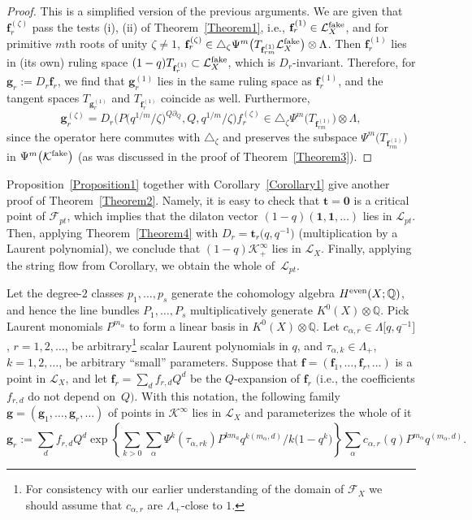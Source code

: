 \documentclass[pdftex]{sigma}
\def\F{\mathcal F}
\def\K{\mathcal K}
\def\L{\mathcal L}
\def\1{\mathbf 1}
\def\QQ{\mathbb Q}
\def\p{\partial}
\def\a{\alpha}
\def\f{{\mathbf f}}
\def\g{{\mathbf g}}
\def\t{{\mathbf t}}
\renewcommand{\Delta}{\triangle}
\begin{document}
\begin{proof} This is a simplified version of the previous arguments. We are given that $\f_r^{(\zeta)}$ pass the tests (i), (ii) of Theorem~\ref{Theorem1}, i.e.,
$\f_r^{(1)} \in \L_X^{\rm fake}$, and for primitive $m$th roots of unity $\zeta\neq 1$,
$\f_r^{(\zeta)}\in \Delta_{\zeta} \Psi^m\big(T_{\f_{rm}^{(1)}}\L_X^{\rm fake}\big)\otimes \Lambda$.
Then $\f_r^{(1)}$ lies in (its own) ruling space $(1-q)T_{\f_r^{(1)}}\subset \L_X^{\rm fake}$, which is $D_r$-invariant. Therefore, for $\g_r:=D_r\f_r$, we find that $\g_r^{(1)}$ lies in the same ruling space as $\f_r^{(1)}$, and the tangent spaces $T_{\g_r^{(1)}}$ and $T_{\f_r^{(1)}}$ coincide as well. Furthermore,
\[ \g_r^{(\zeta)} = D_r\big(P\big(q^{1/m}/\zeta\big)^{Q\p_Q}, Q, q^{1/m}/\zeta\big) f_r^{(\zeta)} \in
\Delta_{\zeta} \Psi^m\big(T_{\f_{rm}^{(1)}}\big)\otimes \Lambda ,\]
since the operator here commutes with $\Delta_{\zeta}$ and preserves the subspace $\Psi^m\big(T_{\f_{rm}^{(1)}}\big)$ in $\Psi^m\big(\K^{\rm fake}\big)$ (as was discussed in the proof of Theorem~\ref{Theorem3}). \end{proof}

\begin{remark} Proposition~\ref{Proposition1} together with Corollary~\ref{Corollary1} give another proof of Theorem~\ref{Theorem2}. Namely, it is easy to check that $\t={\mathbf 0}$ is a critical point of $\F_{pt}$, which implies that the dilaton vector $(1-q)(\1,\1,\dots)$ lies in $\L_{pt}$. Then, applying Theorem~\ref{Theorem4} with $D_r=\t_r\big(q,q^{-1}\big)$ (multiplication by a Laurent polynomial),
we conclude that $(1-q)\K^{\infty}_{+}$ lies in $\L_X$. Finally, applying the string flow from Corollary, we obtain the whole of~$\L_{pt}$. \end{remark}

\begin{theorem}\label{Theorem4} Let the degree-$2$ classes $p_1,\dots, p_s$ generate the cohomology algebra $H^{\rm even}(X;\QQ)$, and hence the line bundles $P_1,\dots,P_s$ multiplicatively generate $K^0(X)\otimes \QQ$. Pick Laurent monomials $P^{m_{\a}}$ to form a linear basis in $K^0(X)\otimes \QQ$. Let $c_{\a,r}\in \Lambda \big[q,q^{-1}\big]$, $r=1,2,\dots$, be arbitrary\footnote{For consistency with our earlier understanding of the domain of $\F_X$ we should assume that $c_{\a,r}$ are $\Lambda_{+}$-close to $1$.} scalar Laurent polynomials in $q$, and $\tau_{\a,k} \in \Lambda_{+}$, $k=1,2,\dots$, be arbitrary ``small'' parameters. Suppose that $\f=(\f_1,\dots,\f_r,\dots)$ is a point in $\L_X$, and let $\f_r=\sum_d f_{r,d} Q^d$ be the $Q$-expansion of $\f_r$ $($i.e., the coefficients $f_{r,d}$ do not depend on~$Q)$. With this notation, the following family $\g =(\g_1,\dots, \g_r,\dots)$ of points in $\K^{\infty}$ lies in $\L_X$ and parameterizes the whole of it
 \[ \g_r:= \sum_d f_{r,d} Q^d \exp\left\{\sum_{k>0} \sum_\a \Psi^k(\tau_{\a,rk}) P^{km_a}q^{k(m_\a,d)}/k\big(1-q^k\big)\right\}
 \sum_{\a} c_{\a,r}(q) P^{m_\a}q^{(m_\a,d)}.\]
\end{theorem}
\end{document}
